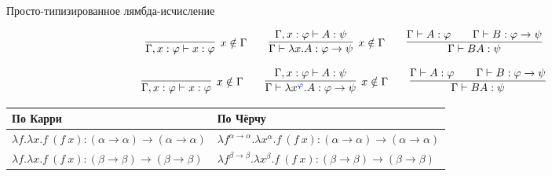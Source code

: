 \documentclass[aspectratio=169]{beamer}
\begin{document}
\begin{frame}{Просто-типизированное лямбда-исчисление}
\begin{dfn}\vspace{-0.5cm}
$$\infer[x \notin \Gamma]{\Gamma,x:\varphi \vdash x:\varphi}{} \quad\quad 
  \infer[x \notin \Gamma]{\Gamma\vdash \lambda x.A: \varphi\rightarrow\psi}{\Gamma,x:\varphi\vdash A:\psi} \quad\quad 
  \infer{\Gamma\vdash B A:\psi}{\Gamma\vdash A:\varphi\quad\quad\Gamma\vdash B:\varphi\rightarrow\psi}$$
\end{dfn}

\begin{dfn}\vspace{-0.5cm}
$$\infer[x \notin \Gamma]{\Gamma,x:\varphi \vdash x:\varphi}{} \quad\quad 
  \infer[x \notin \Gamma]{\Gamma\vdash \lambda x^{\color{blue}\varphi}.A: \varphi\rightarrow\psi}{\Gamma,x:\varphi\vdash A:\psi} \quad\quad 
  \infer{\Gamma\vdash B A:\psi}{\Gamma\vdash A:\varphi\quad\quad\Gamma\vdash B:\varphi\rightarrow\psi}$$
\end{dfn}\pause

\begin{exm}
\begin{tabular}{l|l}
По Карри & По Чёрчу\\\hline
$\lambda f.\lambda x.f\ (f\ x) : (\alpha\rightarrow\alpha)\rightarrow(\alpha\rightarrow\alpha)$ & $\lambda f^{\alpha\rightarrow\alpha}.\lambda x^\alpha.f\ (f\ x) : (\alpha\rightarrow\alpha)\rightarrow(\alpha\rightarrow\alpha)$\\\pause
$\lambda f.\lambda x.f\ (f\ x) : (\beta\rightarrow\beta)\rightarrow(\beta\rightarrow\beta)$ & $\lambda f^{\beta\rightarrow\beta}.\lambda x^\beta.f\ (f\ x) : (\beta\rightarrow\beta)\rightarrow(\beta\rightarrow\beta)$
\end{tabular}
\end{exm}

\end{frame}
\end{document}
